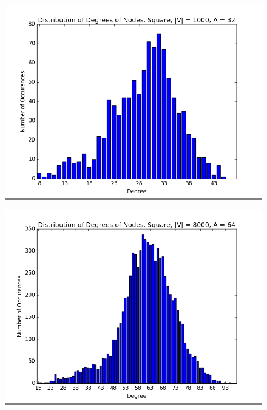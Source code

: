 \documentclass{article}
\begin{document}
\begin{figure}
    \begin{minipage}{0.3\textwidth}
    \colorbox{gray}{\includegraphics[width=\linewidth]{./graphs/hist_deg_square_0.png}}
    \end{minipage}
    \hspace{\fill}
    \begin{minipage}{0.3\textwidth}
    \colorbox{gray}{\includegraphics[width=\linewidth]{./graphs/hist_deg_square_1.png}}
    \end{minipage}
    \hspace{\fill}
    \begin{minipage}{0.3\textwidth}

\end{minipage}
\end{figure}
\end{document}
